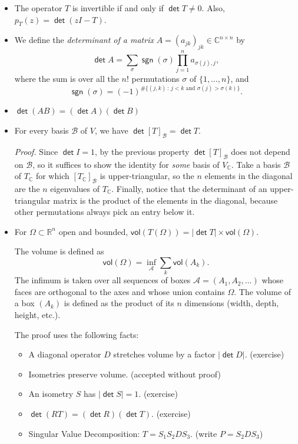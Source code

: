 \documentclass[11pt]{article}
\newcommand{\1}{\mathbf{1}}
\newcommand{\0}{\mathbf{0}}
\newcommand{\A}{\mathcal{A}}
\newcommand{\B}{\mathcal{B}}
\newcommand{\C}{\mathbb{C}}
\newcommand{\R}{\mathbb{R}}
\DeclareMathOperator{\mydet}{\mathsf{det}}
\DeclareMathOperator{\mysgn}{\mathsf{sgn}}
\newcommand{\spitem}{\item[$\circ$]}
\begin{document}
{\begin{itemize}
\item

The operator $T$ is invertible if and only if $\mydet T \ne 0$.
Also,
$p_T(z) = \mydet( zI - T )$.


\item

We define the \emph{determinant of a matrix} $A = (a_{jk})_{jk} \in \C^{n \times n}$ by
\[
\mydet A = \sum_{\sigma} \mysgn(\sigma) \prod_{j=1}^n a_{\sigma(j),j}
,
\]
where the sum is over all the $n!$ permutations $\sigma$ of $ \{1,\dots,n\} $, and
\[
\mysgn(\sigma) = (-1)^{\#\{(j,k) \,:\, j<k \text{ and } \sigma(j) > \sigma(k) \}}
.
\]


\item

$\mydet(AB)=(\mydet A)(\mydet B)$


\item

For every basis $\B$ of $ V $,
we have
$\mydet [T]_\B = \mydet T$.

\emph{Proof.}
Since $\mydet I = 1$, by the previous property $\mydet [T]_\B$ does not depend on $\B$, so it suffices to show the identity for \emph{some} basis of $ V_\C $.
Take a basis $\B$ of $T_\C$ for which $[T_\C]_{\B}$ is upper-triangular, so the $n$ elements in the diagonal are the $n$ eigenvalues of $T_\C$.
Finally, notice that the determinant of an upper-triangular matrix is the product of the elements in the diagonal, because other permutations always pick an entry below it.

\spitem

For $\Omega \subset \R^n$ open and bounded,
$\mathsf{vol}(T(\Omega))=|\mydet T| \times \mathsf{vol}(\Omega)$.

The volume is defined as
$$\mathsf{vol}(\Omega) = \inf_\A \sum_k \mathsf{vol}(A_k).$$
The infimum is taken over all sequences of boxes $\A = (A_1,A_2,\dots)$ whose faces are orthogonal to the axes and whose union contains $\Omega$.
The volume of a box $(A_k)$ is defined as the product of its $n$ dimensions (width, depth, height, etc.).

The proof uses the following facts:
\begin{itemize}
\item
A diagonal operator $D$ stretches volume by a factor $|\mydet D|$.
\hfill
(exercise)
\item
Isometries preserve volume.
\hfill
(accepted without proof)
\item
An isometry $S$ has $|\mydet S|=1$.
\hfill
(exercise)
\item
$\mydet(RT)=(\mydet R)(\mydet T)$.
\hfill
(exercise)
\item
Singular Value Decomposition: $T = S_1 S_2 D S_3$.
\hfill
(write $P = S_2 D S_3$)
\end{itemize}


\end{itemize}}
\end{document}
